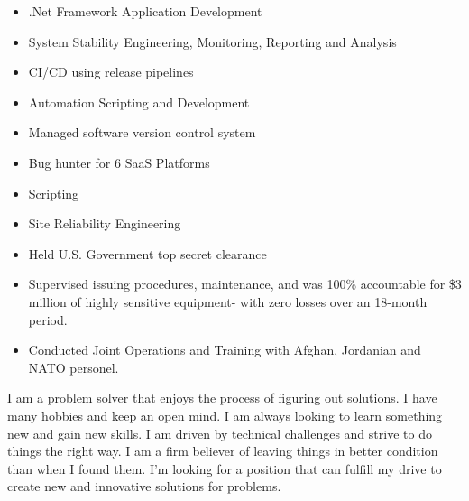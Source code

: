 \documentclass[10pt,a4paper,ragged2e,withhyper]{altacv}
\begin{document}


\makecvheader


\begin{paracol}{2}

\begin{itemize}
\item .Net Framework Application Development
\item System Stability Engineering, Monitoring, Reporting and Analysis
\item CI/CD using release pipelines
\item Automation Scripting and Development
\item Managed  software version control system 
\end{itemize}

\divider

\begin{itemize}
\item Bug hunter for 6 SaaS Platforms
\item Scripting
\item Site Reliability Engineering
\end{itemize}

\divider

\begin{itemize}
\item Held U.S. Government top secret clearance
\item Supervised issuing procedures, maintenance, and was 100\% accountable for \$3 million of highly sensitive equipment- with zero losses over an 18-month period.
\item Conducted Joint Operations and Training with Afghan, Jordanian and NATO personel. 
\end{itemize}

\medskip


I am a problem solver that enjoys the process of figuring out solutions. I have many hobbies and keep an open mind. I am always looking to learn something new and gain new skills. I am driven by technical challenges and strive to do things the right way. I am a firm believer of leaving things in better condition than when I found them. I’m looking for a position that can fulfill my drive to create new and innovative solutions for problems.


\end{paracol}
\end{document}
